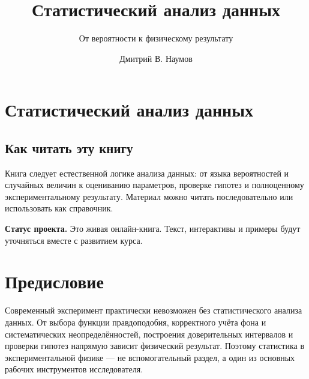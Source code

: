 \documentclass[
  russian,
  12pt,
  a4paper,
  a4paper,
  openany]{scrbook}
\title{Статистический анализ данных}
\subtitle{От вероятности к физическому результату}
\author{Дмитрий В. Наумов}
\date{}
\begin{document}
\frontmatter
\maketitle


\mainmatter
{}

\chapter*{Статистический анализ
данных}\label{ux441ux442ux430ux442ux438ux441ux442ux438ux447ux435ux441ux43aux438ux439-ux430ux43dux430ux43bux438ux437-ux434ux430ux43dux43dux44bux445}


\section*{Как читать эту
книгу}\label{ux43aux430ux43a-ux447ux438ux442ux430ux442ux44c-ux44dux442ux443-ux43aux43dux438ux433ux443}


Книга следует естественной логике анализа данных: от языка вероятностей
и случайных величин к оцениванию параметров, проверке гипотез и
полноценному экспериментальному результату. Материал можно читать
последовательно или использовать как справочник.

\begin{booknote}

\textbf{Статус проекта.} Это живая онлайн-книга. Текст, интерактивы и
примеры будут уточняться вместе с развитием курса.

\end{booknote}


\chapter*{Предисловие}\label{ux43fux440ux435ux434ux438ux441ux43bux43eux432ux438ux435}


Современный эксперимент практически невозможен без статистического
анализа данных. От выбора функции правдоподобия, корректного учёта фона
и систематических неопределённостей, построения доверительных интервалов
и проверки гипотез напрямую зависит физический результат. Поэтому
статистика в экспериментальной физике --- не вспомогательный раздел, а
один из основных рабочих инструментов исследователя.
\end{document}
